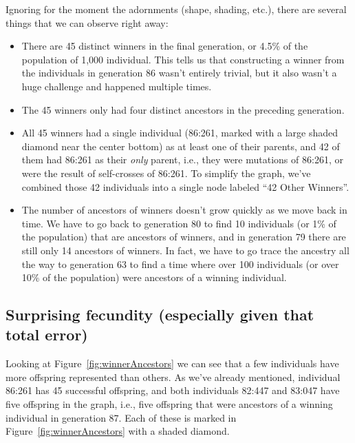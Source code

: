 Ignoring for the moment the adornments (shape, shading, etc.), there are several things that
we can observe right away:
\begin{itemize}
	\item There are 45 distinct winners in the final generation, or 4.5\% of the population of
	1,000 individual. This tells us that constructing a winner from the individuals in generation 86
	wasn't entirely trivial, but it also wasn't a huge challenge and happened multiple times.
	\item The 45 winners only had four distinct ancestors in the preceding generation.
	\item All 45 winners had a single individual (86:261, marked with a large shaded diamond near
	the center bottom) as at least one of their parents, and 42 of
	them had 86:261 as their \emph{only} parent, i.e., they were mutations of 86:261, or were the result
	of self-crosses of 86:261. To simplify the graph, we've combined those 42 individuals into a
	single node labeled ``42 Other Winners''.
	\item The number of ancestors of winners doesn't grow quickly as we move back in time. We have to
	go back to generation 80 to find 10 individuals (or 1\% of the population) that are ancestors of
	winners, and in generation 79 there are still only 14 ancestors of winners. In fact, we have to
	go trace the ancestry all the way to generation 63 to find a time where over 100 individuals (or over 10\% of 
	the population) were ancestors of a winning individual.
\end{itemize}

\subsection{Surprising fecundity (especially given that total error)}
\label{sec:surprisingFecundity}

Looking at Figure~\ref{fig:winnerAncestors} we can see that a few individuals have more offspring
represented than others. As we've already mentioned, individual 86:261 has 45 successful offspring,
and both individuals 82:447 and 83:047 have five offspring in the graph, i.e., five offspring that were
ancestors of a winning individual in generation 87. Each of these is marked in 
Figure~\ref{fig:winnerAncestors} with a shaded diamond.

